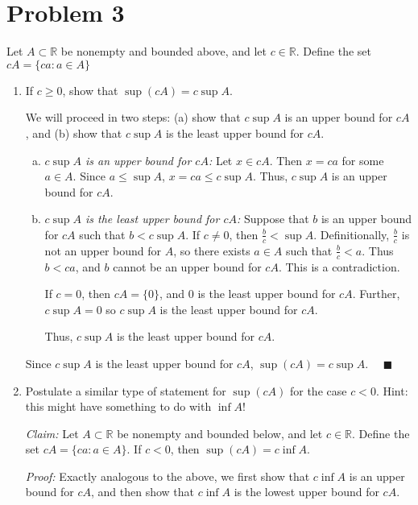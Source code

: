\documentclass[12pt]{article}
\newcommand{\R}{\mathbb{R}}
\newcommand{\qed}{\quad \blacksquare}
\begin{document}
\section*{Problem 3}
    Let $A \subset \R$ be nonempty and bounded above, and let $c \in \R$. Define the set $cA = \{ca : a \in A\}$
    \begin{enumerate}
        \item If $c \geq 0$, show that $\sup(cA) = c \sup A$.
        
            \color{blue}
                We will proceed in two steps: (a) show that $c \sup A$ is an upper bound for $cA$, and (b) show that $c \sup A$ is the least upper bound for $cA$.
                \begin{enumerate}[(a)]
                    \item \emph{$c \sup A$ is an upper bound for $cA$:} Let $x \in cA$. Then $x = ca$ for some $a \in A$. Since $a \leq \sup A$,  $x = ca \leq c \sup A$. Thus, $c \sup A$ is an upper bound for $cA$.

                    \item \emph{$c \sup A$ is the least upper bound for $cA$:} Suppose that $b$ is an upper bound for $cA$ such that $b < c \sup A$. If $c \neq 0$, then $\frac{b}{c} < \sup A$. Definitionally, $\frac{b}{c}$ is not an upper bound for $A$, so there exists $a \in A$ such that $\frac{b}{c} < a$. Thus $b < ca$, and $b$ cannot be an upper bound for $cA$. This is a contradiction. 
                    
                    If $c = 0$, then $cA = \{0\}$, and $0$ is the least upper bound for $cA$. Further, $c \sup A = 0$ so $c \sup A$ is the least upper bound for $cA$.

                    Thus, $c \sup A$ is the least upper bound for $cA$.
                \end{enumerate}
                Since $c\sup A$ is the least upper bound for $cA$, $\sup(cA) = c \sup A$. $\qed$
            \color{black}

        \item Postulate a similar type of statement for $\sup(cA)$ for the case $c < 0$. Hint: this might have something to do with $\inf A$!
        
            \color{blue}
                \emph{Claim:} Let $A \subset \R$ be nonempty and bounded below, and let $c \in \R$. Define the set $cA = \{ca : a \in A\}$. If $c < 0$, then $\sup(cA) = c \inf A$.

                \emph{Proof:} Exactly analogous to the above, we first show that $c \inf A$ is an upper bound for $cA$, and then show that $c \inf A$ is the lowest upper bound for $cA$.


\end{enumerate}
\end{document}
